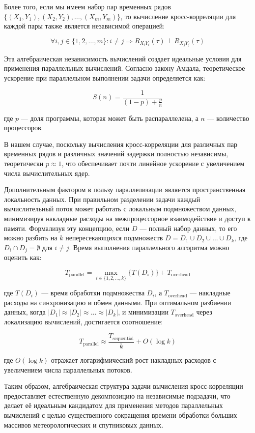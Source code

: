 Более того, если мы имеем набор пар временных рядов $\{(X_1, Y_1), (X_2, Y_2),
	\ldots, (X_m, Y_m)\}$, то вычисление кросс-корреляции для каждой пары также
является независимой операцией:

\[
	\forall i, j \in \{1, 2, \ldots, m\}: i \neq j \Rightarrow R_{X_i Y_i}(\tau) \perp R_{X_j Y_j}(\tau)
\]

Эта алгебраическая независимость вычислений создает идеальные условия для
применения параллельных вычислений. Согласно закону Амдала, теоретическое
ускорение при параллельном выполнении задачи определяется как:

\[
	S(n) = \frac{1}{(1-p) + \frac{p}{n}}
\]

где $p$ — доля программы, которая может быть распараллелена, а $n$ — количество процессоров.

В нашем случае, поскольку вычисления кросс-корреляции для различных пар
временных рядов и различных значений задержки полностью независимы, теоретически
$p \approx 1$, что обеспечивает почти линейное ускорение с увеличением числа
вычислительных ядер.

Дополнительным фактором в пользу параллелизации является пространственная
локальность данных. При правильном разделении задачи каждый вычислительный поток
может работать с локальным подмножеством данных, минимизируя накладные расходы
на межпроцессорное взаимодействие и доступ к памяти. Формализуя эту концепцию,
если $D$ — полный набор данных, то его можно разбить на $k$ непересекающихся
подмножеств $D = D_1 \cup D_2 \cup \ldots \cup D_k$, где $D_i \cap D_j =
	\emptyset$ для $i \neq j$. Время выполнения параллельного алгоритма можно
оценить как:

\[
	T_{\text{parallel}} = \max_{i \in \{1, 2, \ldots, k\}} \{T(D_i)\} + T_{\text{overhead}}
\]

где $T(D_i)$ — время обработки подмножества $D_i$, а $T_{\text{overhead}}$ —
накладные расходы на синхронизацию и обмен данными. При оптимальном разбиении
данных, когда $|D_1| \approx |D_2| \approx \ldots \approx |D_k|$, и минимизации
$T_{\text{overhead}}$ через локализацию вычислений, достигается соотношение:

\[
	T_{\text{parallel}} \approx \frac{T_{\text{sequential}}}{k} + O(\log k)
\]

где $O(\log k)$ отражает логарифмический рост накладных расходов с увеличением
числа параллельных потоков.


Таким образом, алгебраическая структура задачи вычисления кросс-корреляции
предоставляет естественную декомпозицию на независимые подзадачи, что делает её
идеальным кандидатом для применения методов параллельных вычислений с целью
существенного сокращения времени обработки больших массивов метеорологических и
спутниковых данных.






